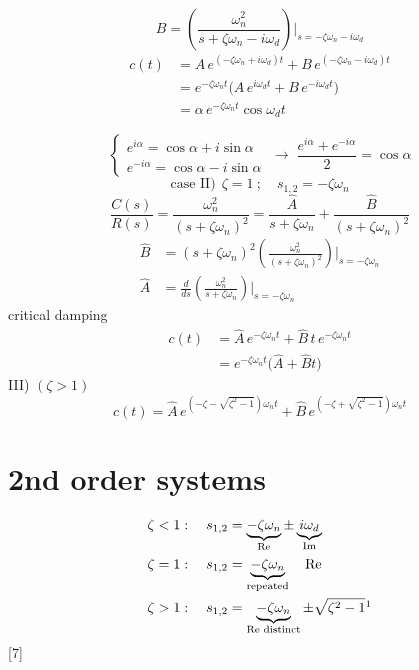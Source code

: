 \documentclass[11pt,a4paper]{article}
\begin{document}
\[ B=\left(\frac{\omega_n^2}{s+\zeta\omega_n-i\omega_d}\right)\Bigg|_{s=-\zeta\omega_n-i\omega_d} \]
\begin{align*}
c(t)&=A\,e^{(-\zeta\omega_n+i\omega_d)t}+B\,e^{(-\zeta\omega_n-i\omega_d)t}\\
&=e^{-\zeta\omega_n t}\bigl(A\,e^{i\omega_d t}+B\,e^{-i\omega_d t}\bigr)\\
&=\alpha\,e^{-\zeta\omega_n t}\cos\omega_d t
\end{align*}
\begin{center}
\end{center}
\[ \begin{cases} e^{i\alpha}=\cos\alpha+i\sin\alpha\\ e^{-i\alpha}=\cos\alpha-i\sin\alpha \end{cases} \;\to\; \frac{e^{i\alpha}+e^{-i\alpha}}{2}=\cos\alpha \]
\[ \text{case II)}\ \ \zeta=1\ ;\quad s_{1,2}=-\zeta\omega_n \]
\[ \frac{C(s)}{R(s)}=\frac{\omega_n^2}{(s+\zeta\omega_n)^2}=\frac{\hat{A}}{s+\zeta\omega_n}+\frac{\hat{B}}{(s+\zeta\omega_n)^2} \]
\begin{align*}
\hat{B}&=(s+\zeta\omega_n)^2\left(\frac{\omega_n^2}{(s+\zeta\omega_n)^2}\right)\Big|_{s=-\zeta\omega_n}\\
\hat{A}&=\frac{d}{ds}\left(\frac{\omega_n^2}{s+\zeta\omega_n}\right)\Big|_{s=-\zeta\omega_n}
\end{align*}
critical damping
\begin{align*}
c(t)&=\hat{A}\,e^{-\zeta\omega_n t}+\hat{B}\,t\,e^{-\zeta\omega_n t}\\
&=e^{-\zeta\omega_n t}\bigl(\hat{A}+\hat{B}t\bigr)
\end{align*}
III) $(\zeta>1)$
\[ c(t)=\hat{A}\,e^{(-\zeta-\sqrt{\zeta^2-1})\omega_n t}+\hat{B}\,e^{(-\zeta+\sqrt{\zeta^2-1})\omega_n t} \]

\section{2nd order systems}
\begin{align*}
\zeta<1:\quad s_{1,2}&=\underbrace{-\zeta\omega_n}_{\text{Re}}\pm\underbrace{i\omega_d}_{\text{Im}}\\
\zeta=1:\quad s_{1,2}&=\underbrace{-\zeta\omega_n}_{\text{repeated}}\quad\text{Re}\\
\zeta>1:\quad s_{1,2}&=\underbrace{-\zeta\omega_n}_{\text{Re distinct}}\pm\sqrt{\zeta^2-1}\footnotemark
\end{align*}
[7]
\end{document}
